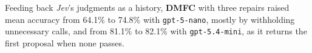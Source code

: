 Feeding back \textit{Jev}'s judgments as a history, \textbf{DMFC} with three repairs raised mean accuracy from 64.1\% to 74.8\% with \texttt{gpt-5-nano}, mostly by withholding unnecessary calls, and from 81.1\% to 82.1\% with \texttt{gpt-5.4-mini}, as it returns the first proposal when none passes.
